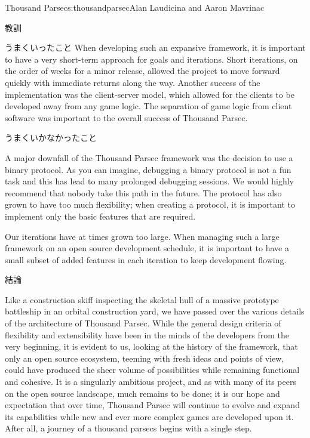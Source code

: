 \begin{aosachapter}{Thousand Parsec}{s:thousandparsec}{Alan Laudicina and Aaron Mavrinac}
\begin{aosasect1}{教訓}
\begin{aosasect2}{うまくいったこと}
When developing such an expansive framework, it is important to have a
very short-term approach for goals and iterations. Short iterations, on the order of weeks for a minor release,
allowed the project to move forward quickly with immediate returns
along the way. Another success of the
implementation was the client-server model, which allowed for the
clients to be developed away from any game logic. The separation of
game logic from client software was important to the overall success
of Thousand Parsec.

\end{aosasect2}

\begin{aosasect2}{うまくいかなかったこと}

A major downfall of the Thousand Parsec framework was the decision to
use a binary protocol. As you can imagine, debugging a binary protocol
is not a fun task and this has lead to many prolonged debugging
sessions. We would highly recommend that nobody take this path in the
future. The protocol has also grown to have too much flexibility; when
creating a protocol, it is important to implement only the basic
features that are required.

Our iterations have at times grown too large. When managing such a
large framework on an open source development schedule, it is
important to have a small subset of added features in each iteration
to keep development flowing.

\end{aosasect2}

\begin{aosasect2}{結論}

Like a construction skiff inspecting the skeletal hull of a massive
prototype battleship in an orbital construction yard, we have passed
over the various details of the architecture of Thousand Parsec. While
the general design criteria of flexibility and extensibility have been
in the minds of the developers from the very beginning, it is evident
to us, looking at the history of the framework, that only an open
source ecosystem, teeming with fresh ideas and points of view, could
have produced the sheer volume of possibilities while remaining
functional and cohesive. It is a singularly ambitious project, and as
with many of its peers on the open source landscape, much remains to
be done; it is our hope and expectation that over time, Thousand
Parsec will continue to evolve and expand its capabilities while new
and ever more complex games are developed upon it. After all, a
journey of a thousand parsecs begins with a single step.

\end{aosasect2}

\end{aosasect1}

\end{aosachapter}
